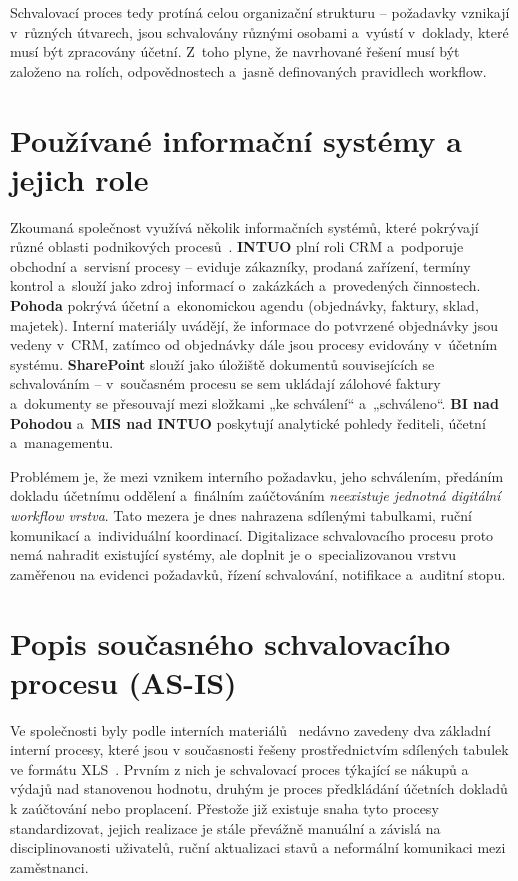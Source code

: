 Schvalovací proces tedy protíná celou organizační strukturu -- požadavky vznikají v~různých útvarech, jsou schvalovány různými osobami a~vyústí v~doklady, které musí být zpracovány účetní. Z~toho plyne, že navrhované řešení musí být založeno na rolích, odpovědnostech a~jasně definovaných pravidlech workflow.


\section{Používané informační systémy a jejich role}

Zkoumaná společnost využívá několik informačních systémů, které pokrývají různé oblasti podnikových procesů~\cite{ref5}. \textbf{INTUO} plní roli CRM a~podporuje obchodní a~servisní procesy -- eviduje zákazníky, prodaná zařízení, termíny kontrol a~slouží jako zdroj informací o~zakázkách a~provedených činnostech. \textbf{Pohoda} pokrývá účetní a~ekonomickou agendu (objednávky, faktury, sklad, majetek). Interní materiály uvádějí, že informace do potvrzené objednávky jsou vedeny v~CRM, zatímco od objednávky dále jsou procesy evidovány v~účetním systému. \textbf{SharePoint} slouží jako úložiště dokumentů souvisejících se schvalováním -- v~současném procesu se sem ukládají zálohové faktury a~dokumenty se přesouvají mezi složkami „ke schválení`` a~„schváleno``. \textbf{BI nad Pohodou} a~\textbf{MIS nad INTUO} poskytují analytické pohledy řediteli, účetní a~managementu.

Problémem je, že mezi vznikem interního požadavku, jeho schválením, předáním dokladu účetnímu oddělení a~finálním zaúčtováním \emph{neexistuje jednotná digitální workflow vrstva}. Tato mezera je dnes nahrazena sdílenými tabulkami, ruční komunikací a~individuální koordinací. Digitalizace schvalovacího procesu proto nemá nahradit existující systémy, ale doplnit je o~specializovanou vrstvu zaměřenou na evidenci požadavků, řízení schvalování, notifikace a~auditní stopu.


\section{Popis současného schvalovacího procesu (AS-IS)}

Ve společnosti byly podle interních materiálů~\cite{ref1} nedávno zavedeny dva základní interní procesy, které jsou v současnosti řešeny prostřednictvím sdílených tabulek ve formátu XLS~\cite{ref2, ref3}. Prvním z nich je schvalovací proces týkající se nákupů a výdajů nad stanovenou hodnotu, druhým je proces předkládání účetních dokladů k zaúčtování nebo proplacení. Přestože již existuje snaha tyto procesy standardizovat, jejich realizace je stále převážně manuální a závislá na disciplinovanosti uživatelů, ruční aktualizaci stavů a neformální komunikaci mezi zaměstnanci.



